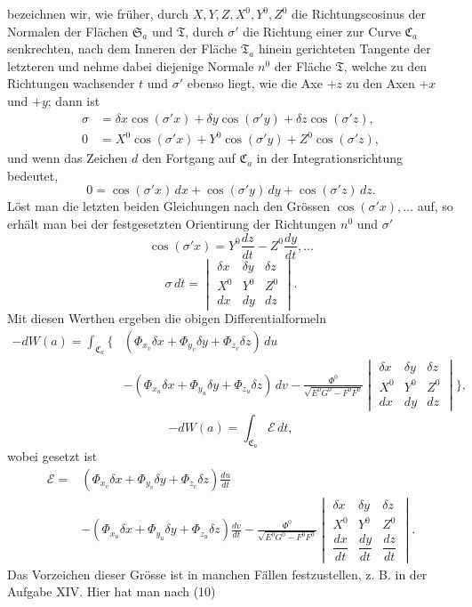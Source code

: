 \documentclass[11pt,a4paper,leqno]{article}
\begin{document}
bezeichnen wir, wie früher, durch $X,Y,Z,X^0,Y^0,Z^0$ die Richtungscosinus
der Normalen der Flächen $\mathfrak{S}_a$ und $\mathfrak{T}$, durch
$\sigma'$ die Richtung einer zur Curve $\mathfrak{C}_a$ senkrechten, nach dem
Inneren der Fläche $\mathfrak{T}_a$ hinein gerichteten Tangente der letzteren
und nehme dabei diejenige Normale $n^0$ der Fläche $\mathfrak{T}$, welche zu
den Richtungen wachsender $t$ und $\sigma'$ ebenso liegt, wie die Axe $+z$ zu
den Axen $+x$ und $+y$; dann ist
\[
\begin{aligned}
\sigma&=\delta x\cos(\sigma'x)+\delta y\cos(\sigma'y)
        +\delta z\cos(\sigma'z),\\
0&=X^0\cos(\sigma'x)+Y^0\cos(\sigma'y)+Z^0\cos(\sigma'z),
\end{aligned}
\]
und wenn das Zeichen $d$ den Fortgang auf $\mathfrak{C}_a$ in der
Integrationsrichtung bedeutet,
\[
0=\cos(\sigma'x)\,dx+\cos(\sigma'y)\,dy+\cos(\sigma'z)\,dz.
\]
Löst man die letzten beiden Gleichungen nach den Grössen
$\cos(\sigma'x),\ldots$ auf, so erhält man bei der festgesetzten Orientirung
der Richtungen $n^0$ und $\sigma'$
\[
\cos(\sigma'x)=Y^0\frac{dz}{dt}-Z^0\frac{dy}{dt},\ldots
\]
\begin{equation}\tag{48}
\sigma\,dt=
\begin{vmatrix}
\delta x&\delta y&\delta z\\
X^0&Y^0&Z^0\\
dx&dy&dz
\end{vmatrix}.
\end{equation}
Mit diesen Werthen ergeben die obigen Differentialformeln
\[
\begin{aligned}
-dW(a)=\int_{\mathfrak{C}_a}\Bigg\{&
(\Phi_{x_v}\delta x+\Phi_{y_v}\delta y+\Phi_{z_v}\delta z)\,du\\
&-(\Phi_{x_u}\delta x+\Phi_{y_u}\delta y+\Phi_{z_u}\delta z)\,dv
-\frac{\Phi^0}{\sqrt{E^0G^0-F^0F^0}}
\begin{vmatrix}
\delta x&\delta y&\delta z\\
X^0&Y^0&Z^0\\
dx&dy&dz
\end{vmatrix}\Bigg\},
\end{aligned}
\]
\[
-dW(a)=\int_{\mathfrak{C}_a}\mathcal{E}\,dt,
\]
wobei gesetzt ist
\begin{equation}\tag{49}
\begin{aligned}
\mathcal{E}={}&
(\Phi_{x_v}\delta x+\Phi_{y_v}\delta y+\Phi_{z_v}\delta z)\frac{du}{dt}\\
&-(\Phi_{x_u}\delta x+\Phi_{y_u}\delta y+\Phi_{z_u}\delta z)\frac{dv}{dt}
-\frac{\Phi^0}{\sqrt{E^0G^0-F^0F^0}}
\begin{vmatrix}
\delta x&\delta y&\delta z\\
X^0&Y^0&Z^0\\
\dfrac{dx}{dt}&\dfrac{dy}{dt}&\dfrac{dz}{dt}
\end{vmatrix}.
\end{aligned}
\end{equation}
Das Vorzeichen dieser Grösse ist in manchen Fällen festzustellen, z. B. in
der Aufgabe XIV. Hier hat man nach (10)
\end{document}
